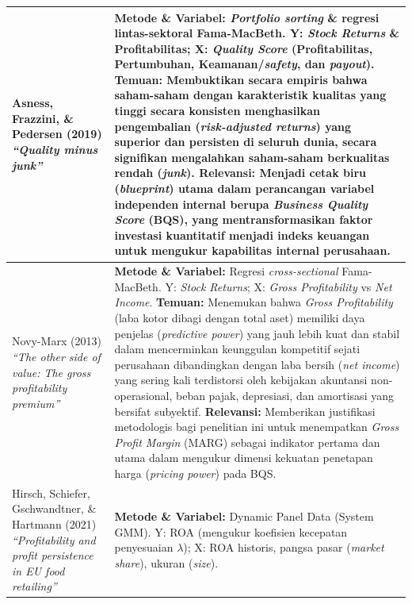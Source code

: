 \documentclass[12pt,a4paper]{article}
\begin{document}
\begin{longtable}{>{\raggedright\arraybackslash}p{} >{\raggedright\arraybackslash}p{}}
\midrule
Asness, Frazzini, \& Pedersen (2019) \newline \textit{``Quality minus junk''} &
\textbf{Metode \& Variabel:} \textit{Portfolio sorting} \& regresi lintas-sektoral Fama-MacBeth. Y: \textit{Stock Returns} \& Profitabilitas; X: \textit{Quality Score} (Profitabilitas, Pertumbuhan, Keamanan/\textit{safety}, dan \textit{payout}). \newline
\textbf{Temuan:} Membuktikan secara empiris bahwa saham-saham dengan karakteristik kualitas yang tinggi secara konsisten menghasilkan pengembalian (\textit{risk-adjusted returns}) yang superior dan persisten di seluruh dunia, secara signifikan mengalahkan saham-saham berkualitas rendah (\textit{junk}). \newline
\textbf{Relevansi:} Menjadi cetak biru (\textit{blueprint}) utama dalam perancangan variabel independen internal berupa \textit{Business Quality Score} (BQS), yang mentransformasikan faktor investasi kuantitatif menjadi indeks keuangan untuk mengukur kapabilitas internal perusahaan. \\
\midrule
Novy-Marx (2013) \newline \textit{``The other side of value: The gross profitability premium''} &
\textbf{Metode \& Variabel:} Regresi \textit{cross-sectional} Fama-MacBeth. Y: \textit{Stock Returns}; X: \textit{Gross Profitability} vs \textit{Net Income}. \newline
\textbf{Temuan:} Menemukan bahwa \textit{Gross Profitability} (laba kotor dibagi dengan total aset) memiliki daya penjelas (\textit{predictive power}) yang jauh lebih kuat dan stabil dalam mencerminkan keunggulan kompetitif sejati perusahaan dibandingkan dengan laba bersih (\textit{net income}) yang sering kali terdistorsi oleh kebijakan akuntansi non-operasional, beban pajak, depresiasi, dan amortisasi yang bersifat subyektif. \newline
\textbf{Relevansi:} Memberikan justifikasi metodologis bagi penelitian ini untuk menempatkan \textit{Gross Profit Margin} (MARG) sebagai indikator pertama dan utama dalam mengukur dimensi kekuatan penetapan harga (\textit{pricing power}) pada BQS. \\
\midrule
Hirsch, Schiefer, Gschwandtner, \& Hartmann (2021) \newline \textit{``Profitability and profit persistence in EU food retailing''} &
\textbf{Metode \& Variabel:} Dynamic Panel Data (System GMM). Y: ROA (mengukur koefisien kecepatan penyesuaian $\lambda$); X: ROA historis, pangsa pasar (\textit{market share}), ukuran (\textit{size}). \newline

\end{longtable}
\end{document}
